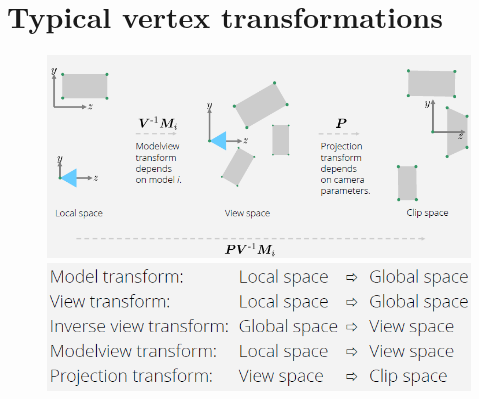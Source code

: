 \documentclass{article}
\begin{document}
\section{Typical vertex transformations}
\begin{figure}
\includegraphics[scale=0.6]{image45.png}\\
\includegraphics[scale=0.6]{image47.png}\\
\end{figure}
\end{document}
